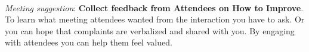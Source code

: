 \ \\
\begin{samepage}
\textit{Meeting suggestion}: \textbf{Collect feedback from Attendees on How to Improve}.\\
To learn what meeting attendees wanted from the interaction you have to ask. Or you can hope that complaints are verbalized and shared with you. By engaging with attendees you can help them feel valued.
\end{samepage}
